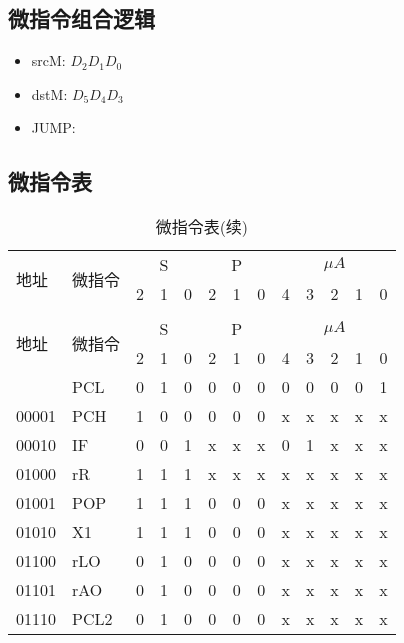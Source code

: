 \documentclass[10pt]{book}
\begin{document}
\subsection{微指令组合逻辑}
\begin{itemize}
  \item srcM: $D_{2}D_{1}D_{0}$
  \item dstM: $D_{5}D_{4}D_{3}$
  \item JUMP: 
\end{itemize}

\subsection{微指令表}
\begin{landscape}
\begin{longtable}{|l|l|c|c|c|c|c|c|c|c|c|c|c|}
\caption{微指令表} \label{tb_micro_prog} \\
\hline
\multirow{2}{1cm}{地址} & \multirow{2}{1.5cm}{微指令} & \multicolumn{3}{c|}{S} & \multicolumn{3}{c|}{P} & \multicolumn {5}{c|}{$\mu A$} \\
\cline{3-13}
                       &                          & 2 & 1 & 0 & 2 & 1 & 0 & 4 & 3 & 2 & 1 & 0 \\
\hline
\endfirsthead
\caption{微指令表(续)} \\
\hline
\multirow{2}{1cm}{地址} & \multirow{2}{1.5cm}{微指令} & \multicolumn{3}{c|}{S} & \multicolumn{3}{c|}{P} & \multicolumn {5}{c|}{$\mu A$} \\
\cline{3-12}
                       &                          & 2 & 1 & 0 & 2 & 1 & 0 & 4 & 3 & 2 & 1 & 0 \\
\hline
\endhead
\hline
\endfoot
00000 & PCL		& 0 & 1 & 0   & 0 & 0 & 0   & 0 & 0 & 0 & 0 & 1 \\
00001 & PCH		& 1 & 0 & 0   & 0 & 0 & 0   & x & x & x & x & x \\
00010 & IF   	& 0 & 0 & 1   & x & x & x   & 0 & 1 & x & x & x \\
01000 & rR   	& 1 & 1 & 1   & x & x & x   & x & x & x & x & x \\
01001 & POP  	& 1 & 1 & 1   & 0 & 0 & 0   & x & x & x & x & x \\
01010 & X1   	& 1 & 1 & 1   & 0 & 0 & 0   & x & x & x & x & x \\
01100 & rLO		& 0 & 1 & 0   & 0 & 0 & 0	& x & x & x & x & x \\
01101 & rAO  	& 0 & 1 & 0   & 0 & 0 & 0   & x & x & x & x & x \\
01110 & PCL2 	& 0 & 1 & 0   & 0 & 0 & 0   & x & x & x & x & x \\
\end{longtable}
\end{landscape}
\end{document}
